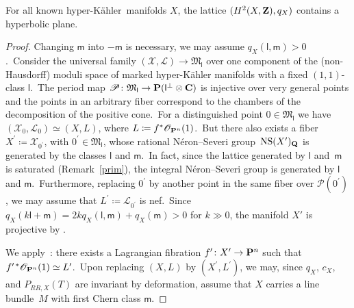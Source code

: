 \documentclass[12pt]{amsart}
\def\cL{\mathscr{L}}
\def\cO{\mathscr{O}}
\def\cP{\mathscr{P}}
\def\cX{\mathscr{X}}
\def\Z{{\bf Z}}
\def\C{{\bf C}}
\def\Q{{\bf Q}}
\def\P{{\bf P}}
\def\PP{{\bf P}}
\DeclareMathOperator{\NS}{NS}
\def\isom{\simeq}
\def\cong{\isom}
\def\hk{hyper-K\"ahler}
\theoremstyle{remark}
\def\lll{\ensuremath{\mathsf l}}
\def\mm{\ensuremath{\mathsf m}}
\begin{document}
For all known \hk\ manifolds $X$, the lattice $(H^2(X,\Z),q_X)$ contains a hyperbolic plane.

\begin{proof}
Changing $\mm$ into $-\mm$ is necessary, we may assume $q_X(\lll,\mm)>0$.\
Consider the universal family $(\cX,\cL)\to {\mathfrak M}_\lll$ over one component of the (non-Hausdorff) moduli space of marked hyper-K\"ahler manifolds with a fixed $(1,1)$-class $\lll$.\
The period map $\cP\colon{\mathfrak M}_\lll\to \PP(\lll^\perp\otimes\C)$ is injective over very general points and the points in an arbitrary fiber correspond to the chambers of the decomposition of the positive cone.\
For a distinguished point $0\in {\mathfrak M}_\lll$ we have $(\cX_0,\cL_0)\cong(X,L )$, where $L\coloneqq f^*\cO_{\P^n}(1)$.\
But there also exists a fiber $X^\prime\coloneqq\cX_{0^\prime}$, with $0^\prime\in{\mathfrak M}_\lll$, whose rational N\'eron--Severi group~$\NS(X^\prime)_\Q$ is generated by the classes $\lll$ and $\mm$.\
In fact, since the lattice generated by $\lll$ and~$\mm$ is saturated (Remark~\ref{prim}), the integral N\'eron--Severi group  is generated by  $\lll$ and $\mm$.\
Furthermore, replacing $0^\prime$ by another point in the same fiber over $\cP(0^\prime)$, we may assume that $L^\prime\coloneqq\cL_{0^\prime}$ is nef.\
Since $q_X(k\lll+\mm)=2kq_X( \lll,\mm)+q_X( \mm)>0$ for $k\gg 0$, the manifold  $X'$ is projective by \cite{HuyHK}.

We apply~\cite[Theorem 1.2, Claim 3.1 and Claim 3.2]{mat:isotropic}: there exists a Lagrangian fibration $f^\prime\colon X^\prime\to \P^n$ such that $f^{\prime\,*}\cO_{\P^n}(1)\cong L^\prime$.\
Upon replacing $(X,L)$ by $(X^\prime,L^\prime)$, we may, since $q_X$, $c_X$, and $P_{RR,X}(T)$ are invariant by deformation, assume that $X$ carries a line bundle~$M$ with first Chern class $\mm$.


\end{proof}
\end{document}
